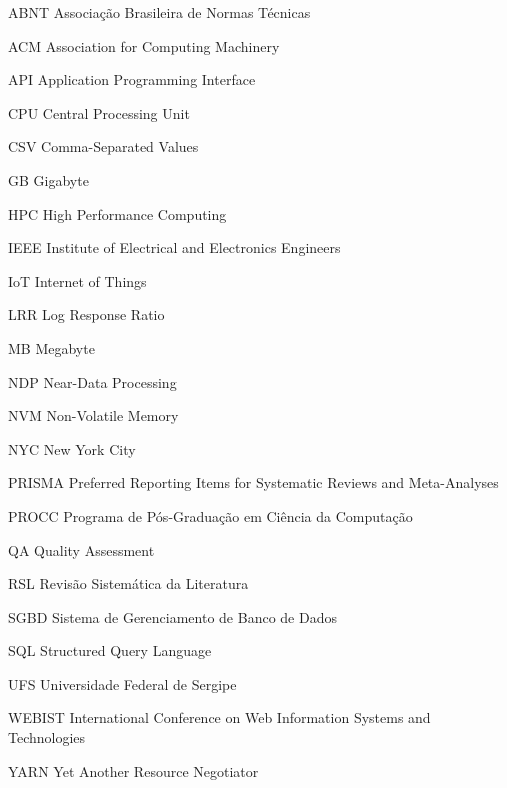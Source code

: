 \begin{siglas}
\item[ABNT]{Associação Brasileira de Normas Técnicas}
\item[ACM]{Association for Computing Machinery}
\item[API]{Application Programming Interface}
\item[CPU]{Central Processing Unit}
\item[CSV]{Comma-Separated Values}
\item[GB]{Gigabyte}
\item[HPC]{High Performance Computing}
\item[IEEE]{Institute of Electrical and Electronics Engineers}
\item[IoT]{Internet of Things}
\item[LRR]{Log Response Ratio}
\item[MB]{Megabyte}
\item[NDP]{Near-Data Processing}
\item[NVM]{Non-Volatile Memory}
\item[NYC]{New York City}
\item[PRISMA]{Preferred Reporting Items for Systematic Reviews and Meta-Analyses}
\item[PROCC]{Programa de Pós-Graduação em Ciência da Computação}
\item[QA]{Quality Assessment}
\item[RSL]{Revisão Sistemática da Literatura}
\item[SGBD]{Sistema de Gerenciamento de Banco de Dados}
\item[SQL]{Structured Query Language}
\item[UFS]{Universidade Federal de Sergipe}
\item[WEBIST]{International Conference on Web Information Systems and Technologies}
\item[YARN]{Yet Another Resource Negotiator}
\end{siglas}

